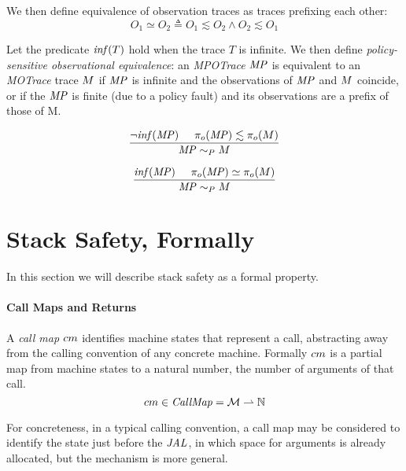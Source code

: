 \documentclass[acmsmall,review,anonymous]{acmart}\settopmatter{printfolios=true,printccs=false,printacmref=false}
\begin{document}
We then define equivalence of observation traces as traces prefixing each other:
\[O_1 \simeq O_2 \triangleq O_1 \lesssim O_2 \land O_2 \lesssim O_1\]



Let the predicate \(\mathit{inf}(T)\) hold when the trace $T$ is infinite.
We then define {\em policy-sensitive observational equivalence}: an
{\it MPOTrace} \(\mathit{MP}\) is equivalent to an {\it MOTrace} trace \(M\) if \(\mathit{MP}\)
is infinite and the observations of \(\mathit{MP}\) and \(M\) coincide, or if the \(\mathit{MP}\)
is finite (due to a policy fault) and its observations are a prefix of those of M.

\[\frac{\neg \mathit{inf}(\mathit{MP}) \hspace{.5cm} \pi_o(\mathit{MP}) \lesssim \pi_o(M)}
           {\mathit{MP} \sim_P M}\]
    
\[\frac{\mathit{inf}(\mathit{MP}) \hspace{.5cm} \pi_o(\mathit{MP}) \simeq \pi_o(M)}
           {\mathit{MP} \sim_P M}\]
    
\section{Stack Safety, Formally}

In this section we will describe stack safety as a formal
property.

\paragraph*{Call Maps and Returns}

A {\it call map} $cm$ identifies machine states that represent a
call, abstracting away from the calling convention of any concrete
machine. Formally $cm$ is a partial map from machine states to a
natural number, the number of arguments of that call.
%
\[cm \in \mathit{CallMap} = {\mathcal M} \rightharpoonup \mathbb{N}\]

For concreteness, in a typical calling convention, a call map may be
considered to identify the state just before the \(\mathit{JAL}\), in which
space for arguments is already allocated, but the mechanism is more
general.
\end{document}
